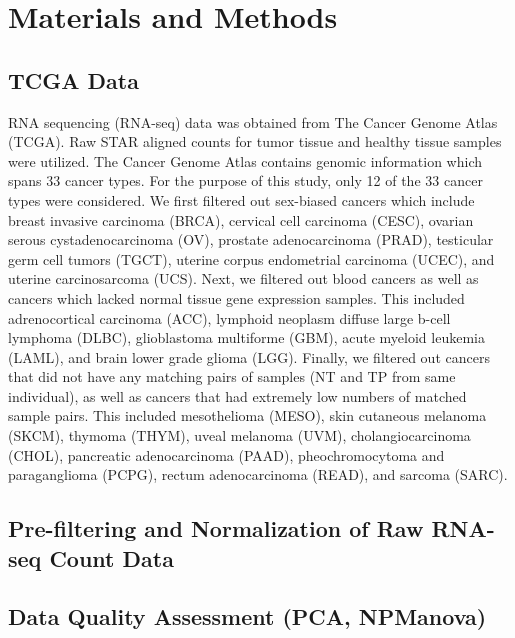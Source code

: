 \documentclass[10pt]{article}
\begin{document}
\newpage
\section{Materials and Methods} 


	\subsection{TCGA Data}
	
	RNA sequencing (RNA-seq) data was obtained from The Cancer Genome Atlas (TCGA). Raw STAR aligned counts for tumor tissue and healthy tissue samples were utilized. The Cancer Genome Atlas contains genomic information which spans 33 cancer types. For the purpose of this study, only 12 of the 33 cancer types were considered. We first filtered out sex-biased cancers which include breast invasive carcinoma (BRCA), cervical cell carcinoma (CESC), ovarian serous cystadenocarcinoma (OV), prostate adenocarcinoma (PRAD), testicular germ cell tumors (TGCT), uterine corpus endometrial carcinoma (UCEC), and uterine carcinosarcoma (UCS). Next, we filtered out blood cancers as well as cancers which lacked normal tissue gene expression samples. This included adrenocortical carcinoma (ACC), lymphoid neoplasm diffuse large b-cell lymphoma (DLBC), glioblastoma multiforme (GBM), acute myeloid leukemia (LAML), and brain lower grade glioma (LGG). Finally, we filtered out cancers that did not have any matching pairs of samples (NT and TP from same individual), as well as cancers that had extremely low numbers of matched sample pairs. This included mesothelioma (MESO), skin cutaneous melanoma (SKCM), thymoma (THYM), uveal melanoma (UVM), cholangiocarcinoma (CHOL), pancreatic adenocarcinoma (PAAD), pheochromocytoma and paraganglioma (PCPG), rectum adenocarcinoma (READ), and sarcoma (SARC). 

	\subsection{Pre-filtering and Normalization of Raw RNA-seq Count Data}

	\subsection{Data Quality Assessment (PCA, NPManova)}
\end{document}
